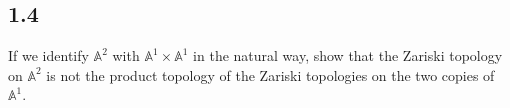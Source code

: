     \subsection*{1.4}

    If we identify $\mathbb{A}^2$ with $\mathbb{A}^1 \times \mathbb{A}^1$ in the natural way, show that the Zariski topology on $\mathbb{A}^2$ is not the product topology of the Zariski topologies on the two copies of $\mathbb{A}^1$.
